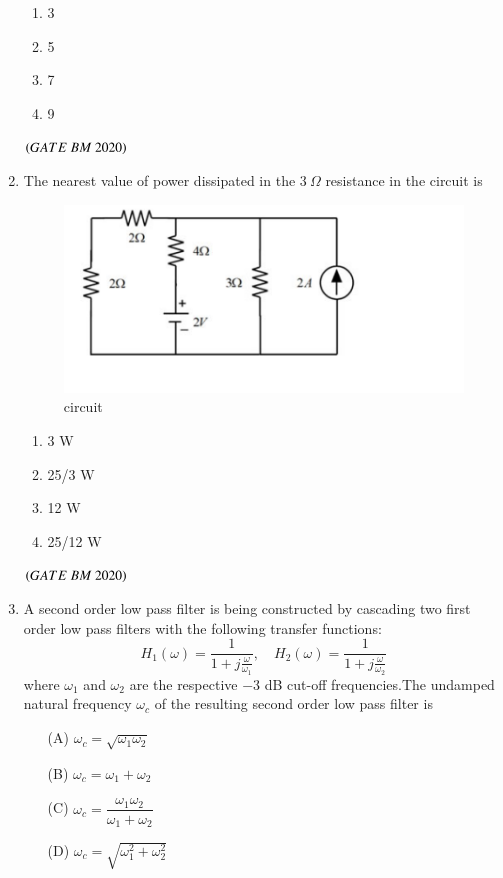 \documentclass[journal,12pt,onecolumn]{IEEEtran}
\theoremstyle{remark}
\begin{document}
\begin{enumerate}
\begin{enumerate}[label=\alph*)] 
\item\hspace{0.5cm}3
\item\hspace{0.5cm}5
\item\hspace{0.5cm}7
\item\hspace{0.5cm}9
\end{enumerate}  
\hfill $\left(GATE\ BM\ 2020\right)$

\item The nearest value of power dissipated in the $3~\Omega$ resistance in the circuit is 
\begin{figure}[H]\centering
\includegraphics[width=0.4\columnwidth]{Figs/fig5.png}
\caption{circuit}
\label{fig:placeholder}
\end{figure}
\begin{enumerate}[label=\alph*)] 
\item\hspace{0.5cm}3 W
\item\hspace{0.5cm}25/3 W
\item\hspace{0.5cm}12 W
\item\hspace{0.5cm}25/12 W
\end{enumerate} 
\hfill $\left(GATE\ BM\ 2020\right)$

\item A second order low pass filter is being constructed by cascading two first order low pass filters with the following transfer functions:  
\[
H_1(\omega) = \frac{1}{1 + j\frac{\omega}{\omega_1}}, 
\quad
H_2(\omega) = \frac{1}{1 + j\frac{\omega}{\omega_2}}
\]
where $\omega_1$ and $\omega_2$ are the respective $-3$ dB cut-off frequencies.The undamped natural frequency $\omega_c$ of the resulting second order low pass filter is  
\begin{enumerate}
    \item[(A)] $\omega_c = \sqrt{\omega_1 \omega_2}$
    \item[(B)] $\omega_c = \omega_1 + \omega_2$
    \item[(C)] $\omega_c = \dfrac{\omega_1 \omega_2}{\omega_1 + \omega_2}$
    \item[(D)] $\omega_c = \sqrt{\omega_1^{2} + \omega_2^{2}}$
\end{enumerate}


\end{enumerate}
\end{document}
